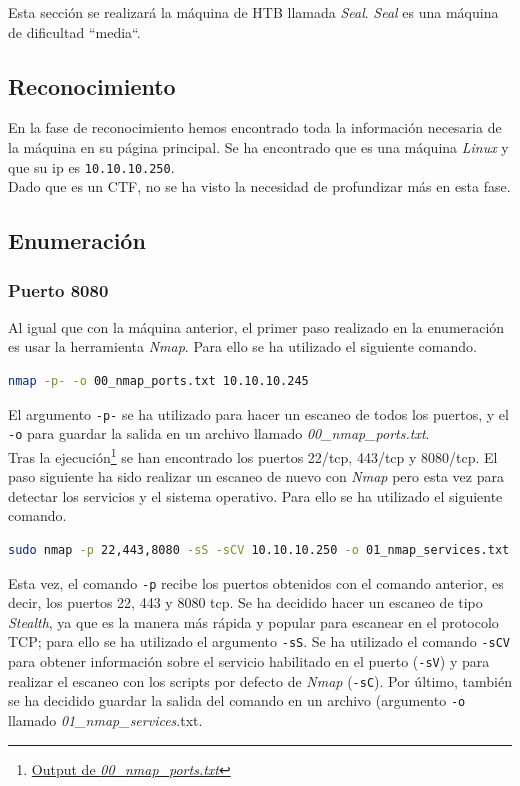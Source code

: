 Esta sección se realizará la máquina de \acrlong{HTB} llamada \textit{Seal}\cite{seal}. \textit{Seal} es una máquina de dificultad ``media``.

\subsection{Reconocimiento}
En la fase de reconocimiento hemos encontrado toda la información necesaria de la máquina en su página principal\cite{seal}. Se ha encontrado que es una máquina \textit{Linux} y que su \acrshort{ip} es \texttt{10.10.10.250}.\\

Dado que es un \acrshort{CTF}, no se ha visto la necesidad de profundizar más en esta fase.

\subsection{Enumeración}
\subsubsection{Puerto 8080}
Al igual que con la máquina anterior, el primer paso realizado en la enumeración es usar la herramienta \textit{Nmap}\cite{nmap}. Para ello se ha utilizado el siguiente comando.

\begin{lstlisting}[language=bash]
nmap -p- -o 00_nmap_ports.txt 10.10.10.245
\end{lstlisting}

El argumento \texttt{-p-} se ha utilizado para hacer un escaneo de todos los puertos, y el \texttt{-o} para guardar la salida en un archivo llamado \textit{00\_nmap\_ports.txt}.\\

Tras la ejecución\footnote{\href{https://github.com/VictorNS69/TFM/blob/main/machines/seal/00_nmap_ports.txt}{Output de \textit{00\_nmap\_ports.txt}}} se han encontrado los puertos 22/\acrshort{tcp}, 443/\acrshort{tcp} y 8080/\acrshort{tcp}. El paso siguiente ha sido realizar un escaneo de nuevo con \textit{Nmap} pero esta vez para detectar los servicios y el sistema operativo. Para ello se ha utilizado el siguiente comando.

\begin{lstlisting}[language=bash]
sudo nmap -p 22,443,8080 -sS -sCV 10.10.10.250 -o 01_nmap_services.txt
\end{lstlisting}

Esta vez, el comando \texttt{-p} recibe los puertos obtenidos con el comando anterior, es decir, los puertos 22, 443 y 8080 \acrshort{tcp}. Se ha decidido hacer un escaneo de tipo \textit{Stealth}, ya que es la manera más rápida y popular para escanear en el protocolo TCP; para ello se ha utilizado el argumento \texttt{-sS}. Se ha utilizado el comando \texttt{-sCV} para obtener información sobre el servicio habilitado en el puerto (\texttt{-sV}) y para realizar el escaneo con los scripts por defecto de \textit{Nmap} (\texttt{-sC}). Por último, también se ha decidido guardar la salida del comando en un archivo (argumento \texttt{-o} llamado \textit{01\_nmap\_services}.txt.\\

